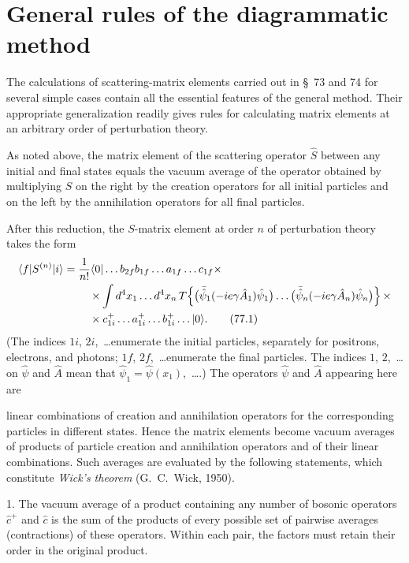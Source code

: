 \section{General rules of the diagrammatic method}

The calculations of scattering-matrix elements carried out in \S~73 and 74 for several simple cases contain all the essential features of the general method. Their appropriate generalization readily gives rules for calculating matrix elements at an arbitrary order of perturbation theory.

As noted above, the matrix element of the scattering operator $\hat S$ between any initial and final states equals the vacuum average of the operator obtained by multiplying $\hat S$ on the right by the creation operators for all initial particles and on the left by the annihilation operators for all final particles.

After this reduction, the $S$-matrix element at order $n$ of perturbation theory takes the form
\begin{align}
\langle f|S^{(n)}|i\rangle
={}&\frac{1}{n!}\langle0|\ldots b_{2f}b_{1f}\ldots a_{1f}\ldots c_{1f}\times\notag\\
&\quad\times\int d^4x_1\ldots d^4x_n\,
T\!\left\{\bigl(\bar{\hat\psi}_1(-ie\gamma\hat A_1)\hat\psi_1\bigr)\ldots
\bigl(\bar{\hat\psi}_n(-ie\gamma\hat A_n)\hat\psi_n\bigr)\right\}\times\notag\\
&\quad\times c^+_{1i}\ldots a^+_{1i}\ldots b^+_{1i}\ldots|0\rangle .
\tag{77.1}
\label{eq:77.1}
\end{align}
(The indices $1i$, $2i$,~\ldots enumerate the initial particles, separately for positrons, electrons, and photons; $1f$, $2f$,~\ldots enumerate the final particles. The indices $1$, $2$,~\ldots on $\hat\psi$ and $\hat A$ mean that $\hat\psi_1=\hat\psi(x_1)$,~\ldots.) The operators $\hat\psi$ and $\hat A$ appearing here are

linear combinations of creation and annihilation operators for the corresponding particles in different states. Hence the matrix elements become vacuum averages of products of particle creation and annihilation operators and of their linear combinations. Such averages are evaluated by the following statements, which constitute \emph{Wick's theorem} (G.~C.~Wick, 1950).

1. The vacuum average of a product containing any number of bosonic operators $\hat c^+$ and $\hat c$ is the sum of the products of every possible set of pairwise averages (contractions) of these operators. Within each pair, the factors must retain their order in the original product.

